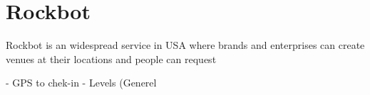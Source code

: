 \section{Rockbot}
Rockbot is an widespread service in USA where brands and enterprises can create venues at their locations and people can request

- GPS to chek-in
- Levels (Generel 
